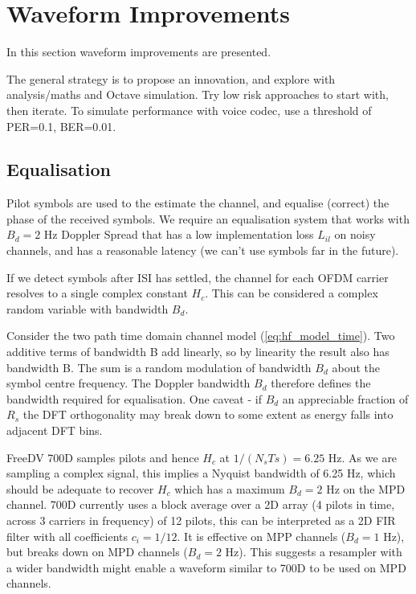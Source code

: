 \documentclass{article}
\begin{document}
\section{Waveform Improvements}

In this section waveform improvements are presented.

The general strategy is to propose an innovation, and explore with analysis/maths and Octave simulation. Try low risk approaches to start with, then iterate.  To simulate performance with voice codec, use a threshold of PER=0.1, BER=0.01.

\subsection{Equalisation}

Pilot symbols are used to the estimate the channel, and equalise (correct) the phase of the received symbols.  We require an equalisation system that works with $B_d=2$ Hz Doppler Spread that has a low implementation loss $L_{il}$ on noisy channels, and has a reasonable latency (we can't use symbols far in the future).

If we detect symbols after ISI has settled, the channel for each OFDM carrier resolves to a single complex constant $H_c$. This can be considered a complex random variable with bandwidth $B_d$. 

Consider the two path time domain channel model (\ref{eq:hf_model_time}). Two additive terms of bandwidth B add linearly, so by linearity the result also has bandwidth B.  The sum is a random modulation of bandwidth $B_d$ about the symbol centre frequency.  The Doppler bandwidth $B_d$ therefore defines the bandwidth required for equalisation. One caveat - if $B_d$ an appreciable fraction of $R_s$ the DFT orthogonality may break down to some extent as energy falls into adjacent DFT bins.

FreeDV 700D samples pilots and hence $H_c$ at $1/(N_sTs)=6.25$ Hz.  As we are sampling a complex signal, this implies a Nyquist bandwidth of 6.25 Hz, which should be adequate to recover $H_c$ which has a maximum $B_d=2$ Hz on the MPD channel. 700D currently uses a block average over a 2D array (4 pilots in time, across 3 carriers in frequency) of 12 pilots, this can be interpreted as a 2D FIR filter with all coefficients $c_i=1/12$. It is effective on MPP channels ($B_d=1$ Hz), but breaks down on MPD channels ($B_d=2$ Hz).  This suggests a resampler with a wider bandwidth might enable a waveform similar to 700D to be used on MPD channels.
\end{document}

